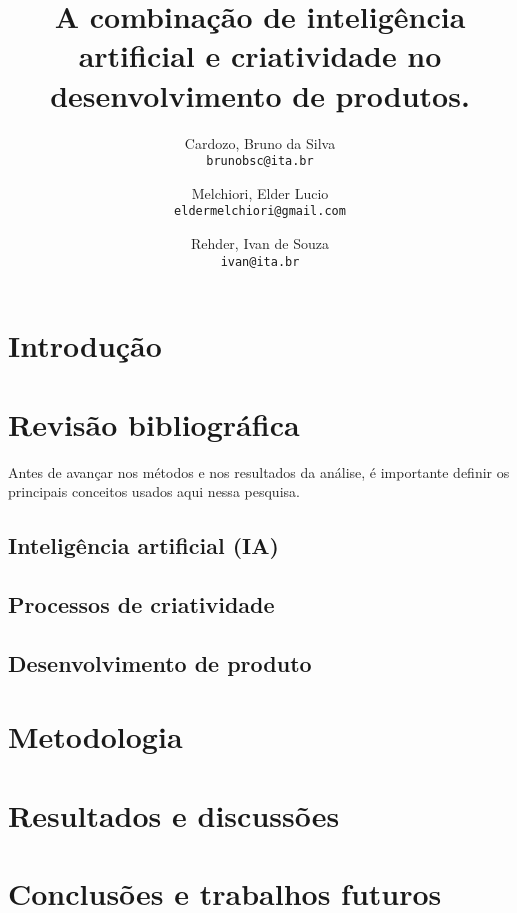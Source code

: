 \documentclass[a4paper, 10pt, dvipsnames]{article}
\title{A combinação de inteligência artificial e criatividade no desenvolvimento de produtos.}
\author{
  Cardozo, Bruno da Silva\\
  \texttt{brunobsc@ita.br}
  \and
  Melchiori, Elder Lucio\\
  \texttt{eldermelchiori@gmail.com}
  \and
  Rehder, Ivan de Souza\\
  \texttt{ivan@ita.br}
}
\begin{document}
\maketitle

\begin{abstract}

\end{abstract}

\section{Introdução}


\section{Revisão bibliográfica}

Antes de avançar nos métodos e nos resultados da análise, é importante definir os principais conceitos usados aqui nessa pesquisa.

\subsection*{Inteligência artificial (IA)}


\subsection*{Processos de criatividade}


\subsection*{Desenvolvimento de produto}


\section{Metodologia}


\section{Resultados e discussões}


\section{Conclusões e trabalhos futuros}


%

\end{document}
